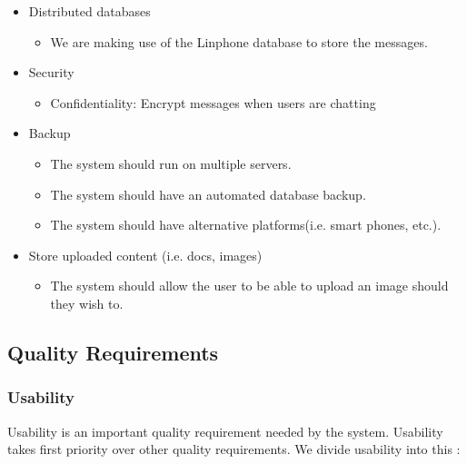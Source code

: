 \documentclass[a4paper]{article}
\begin{document}
\begin{itemize}	
		\item Distributed databases
			\begin{itemize}
				
				\item We are making use of the Linphone database to store the messages.
			\end{itemize}
\end{itemize}

\begin{itemize}	
		\item Security
			\begin{itemize}
				\item Confidentiality: Encrypt messages when users are chatting		
			\end{itemize}
			
		\item Backup
		  \begin{itemize}
			  \item The system should run on multiple servers.
			  \item The system should have an automated database backup.
			  \item The system should have alternative platforms(i.e. smart phones, etc.).
		  \end{itemize}					
		  
		\item Store uploaded content (i.e. docs, images)
		  \begin{itemize}
			  \item The system should allow the user to be able to upload an image should they wish to.
		  \end{itemize}					
		
\end{itemize}

\subsection{Quality Requirements}
\subsubsection{Usability}
Usability is an important quality requirement needed by the system. Usability takes first priority over other quality requirements. We divide usability into this :\\
\end{document}

